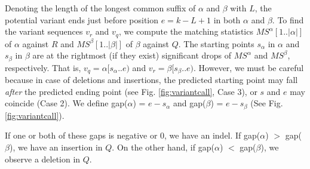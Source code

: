 \documentclass[unnumsec,webpdf,contemporary,large]{oup-authoring-template}%
\theoremstyle{thmstyleone}%
\theoremstyle{thmstyletwo}%
\theoremstyle{thmstylethree}%
\begin{document}
Denoting the length of the longest common suffix of $\alpha$ and $\beta$ with $L$, the potential variant ends just before position $e = k - L + 1$ in both $\alpha$ and $\beta$. To find the variant sequences $v_r$ and $v_q$, we compute the matching statistics $MS^\alpha[1..|\alpha|]$ of $\alpha$ against $R$ and $MS^\beta[1..|\beta|]$ of $\beta$ against $Q$. 
The starting points $s_\alpha$ in $\alpha$ and $s_\beta$ in $\beta$ are at the rightmost (if they exist) significant drops of $MS^\alpha$ and $MS^\beta$, respectively. That is, $v_q = \alpha[s_\alpha..e)$ and $v_r = \beta[s_\beta..e)$. However, we must be careful because in case of deletions and insertions, the predicted starting point may fall \emph{after} the predicted ending point (see Fig. \ref{fig:variantcall}, Case 3), or $s$ and $e$ may coincide (Case 2). We define gap($\alpha$) = $e - s_\alpha$ and gap($\beta$) = $e - s_\beta$ (See Fig. \ref{fig:variantcall}). 

If one or both of these gaps is negative or 0, we have an indel. If gap($\alpha$) $>$  gap($\beta$), we have an insertion in $Q$. On the other hand, if gap($\alpha$) $<$  gap($\beta$), we observe a deletion in $Q$.
\end{document}
